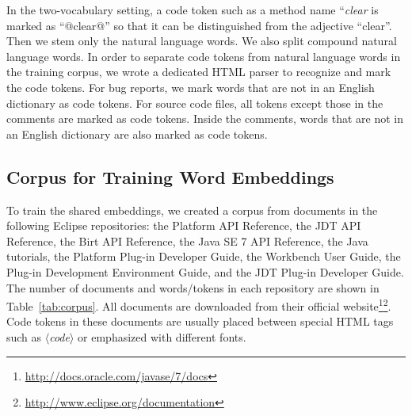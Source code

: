 In the two-vocabulary setting, a code token such as a method name ``{\it clear} is marked as ``@clear@'' so that it can be distinguished from the adjective ``clear''. Then we stem only the natural language words. We also split compound natural language words. In order to separate code tokens from natural language words in the training corpus, we wrote a dedicated HTML parser to recognize and mark the code tokens. For bug reports, we mark words that are not in an English dictionary as code tokens. For source code files, all tokens except those in the comments are marked as code tokens. Inside the comments, words that are not in an English dictionary are also marked as code tokens. 

\subsection{Corpus for Training Word Embeddings}
\label{sec:evaluation:training corpus}

To train the shared embeddings, we created a corpus from documents in the following Eclipse repositories: the Platform API Reference, the JDT API Reference, the Birt API Reference, the Java SE 7 API Reference, the Java tutorials, the Platform Plug-in Developer Guide, the Workbench User Guide, the Plug-in Development Environment Guide, and the JDT Plug-in Developer Guide. The number of documents and words/tokens in each repository are shown in Table~\ref{tab:corpus}. All documents are downloaded from their official website\footnote{\url{http://docs.oracle.com/javase/7/docs}}\footnote{\url{http://www.eclipse.org/documentation}}.  Code tokens in these documents are usually placed between special HTML tags such as $\langle${\it code}$\rangle$ or emphasized with different fonts.

